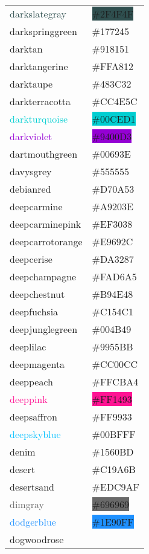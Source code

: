 \documentclass[
]{article}
\begin{document}
\begin{longtable}[]{@{}ll@{}}
\textcolor{darkslategray}{darkslategray} &
\colorbox{darkslategray}{\#2F4F4F}\tabularnewline
\textcolor{darkspringgreen}{darkspringgreen} &
\colorbox{darkspringgreen}{\#177245}\tabularnewline
\textcolor{darktan}{darktan} &
\colorbox{darktan}{\#918151}\tabularnewline
\textcolor{darktangerine}{darktangerine} &
\colorbox{darktangerine}{\#FFA812}\tabularnewline
\textcolor{darktaupe}{darktaupe} &
\colorbox{darklava}{\#483C32}\tabularnewline
\textcolor{darkterracotta}{darkterracotta} &
\colorbox{darkterracotta}{\#CC4E5C}\tabularnewline
\textcolor{darkturquoise}{darkturquoise} &
\colorbox{darkturquoise}{\#00CED1}\tabularnewline
\textcolor{darkviolet}{darkviolet} &
\colorbox{darkviolet}{\#9400D3}\tabularnewline
\textcolor{dartmouthgreen}{dartmouthgreen} &
\colorbox{dartmouthgreen}{\#00693E}\tabularnewline
\textcolor{davysgrey}{davysgrey} &
\colorbox{davysgrey}{\#555555}\tabularnewline
\textcolor{debianred}{debianred} &
\colorbox{debianred}{\#D70A53}\tabularnewline
\textcolor{deepcarmine}{deepcarmine} &
\colorbox{deepcarmine}{\#A9203E}\tabularnewline
\textcolor{deepcarminepink}{deepcarminepink} &
\colorbox{deepcarminepink}{\#EF3038}\tabularnewline
\textcolor{deepcarrotorange}{deepcarrotorange} &
\colorbox{deepcarrotorange}{\#E9692C}\tabularnewline
\textcolor{deepcerise}{deepcerise} &
\colorbox{deepcerise}{\#DA3287}\tabularnewline
\textcolor{deepchampagne}{deepchampagne} &
\colorbox{deepchampagne}{\#FAD6A5}\tabularnewline
\textcolor{deepchestnut}{deepchestnut} &
\colorbox{deepchestnut}{\#B94E48}\tabularnewline
\textcolor{deepfuchsia}{deepfuchsia} &
\colorbox{deepfuchsia}{\#C154C1}\tabularnewline
\textcolor{deepjunglegreen}{deepjunglegreen} &
\colorbox{deepjunglegreen}{\#004B49}\tabularnewline
\textcolor{deeplilac}{deeplilac} &
\colorbox{deeplilac}{\#9955BB}\tabularnewline
\textcolor{deepmagenta}{deepmagenta} &
\colorbox{deepmagenta}{\#CC00CC}\tabularnewline
\textcolor{deeppeach}{deeppeach} &
\colorbox{deeppeach}{\#FFCBA4}\tabularnewline
\textcolor{deeppink}{deeppink} &
\colorbox{deeppink}{\#FF1493}\tabularnewline
\textcolor{deepsaffron}{deepsaffron} &
\colorbox{deepsaffron}{\#FF9933}\tabularnewline
\textcolor{deepskyblue}{deepskyblue} &
\colorbox{capri}{\#00BFFF}\tabularnewline
\textcolor{denim}{denim} & \colorbox{denim}{\#1560BD}\tabularnewline
\textcolor{desert}{desert} & \colorbox{camel}{\#C19A6B}\tabularnewline
\textcolor{desertsand}{desertsand} &
\colorbox{desertsand}{\#EDC9AF}\tabularnewline
\textcolor{dimgray}{dimgray} &
\colorbox{dimgray}{\#696969}\tabularnewline
\textcolor{dodgerblue}{dodgerblue} &
\colorbox{dodgerblue}{\#1E90FF}\tabularnewline
\textcolor{dogwoodrose}{dogwoodrose} &

\end{longtable}
\end{document}
